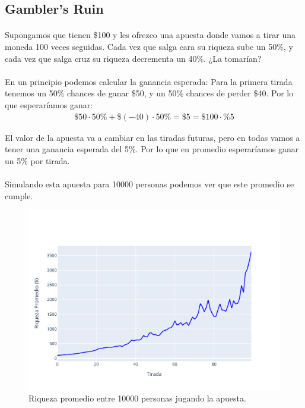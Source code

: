 \documentclass[../main.tex]{subfiles}
\begin{document}
\subsection{Gambler's Ruin}


\paragraph{} Supongamos que tienen \$100 y les ofrezco una apuesta donde vamos a tirar una moneda 100 veces seguidas. Cada vez que salga cara su riqueza sube un 50\%, y cada vez que salga cruz su riqueza decrementa un 40\%. ¿La tomarían?


\paragraph{} En un principio podemos calcular la ganancia esperada: Para la primera tirada tenemos un 50\% chances de ganar \$50, y un 50\% chances de perder \$40. Por lo que esperaríamos ganar:
\begin{gather*}
  \$50 \cdot 50\% + \$(-40) \cdot 50\% = \$5 = \$100 \cdot \%5
\end{gather*}

 El valor de la apuesta va a cambiar en las tiradas futuras, pero en todas vamos a tener una ganancia esperada del 5\%. Por lo que en promedio esperaríamos ganar un 5\% por tirada.

\paragraph{} Simulando esta apuesta para 10000 personas podemos ver que este promedio se cumple.
\begin{figure}[H]
  \centering
  \includegraphics[scale=0.7]{img/mean.pdf}
  \caption{Riqueza promedio entre 10000 personas jugando la apuesta.}
\end{figure}
\end{document}
